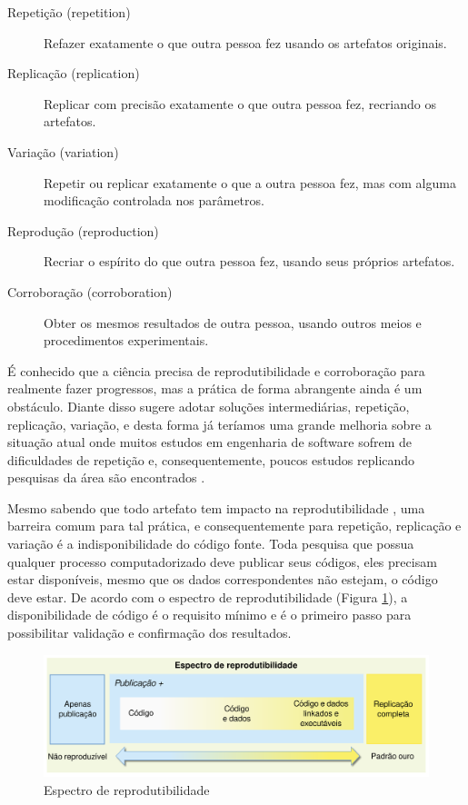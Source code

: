\begin{description}

  \item[Repetição (repetition)]
  Refazer exatamente o que outra pessoa fez usando os artefatos originais.

  \item[Replicação (replication)]
  Replicar com precisão exatamente o que outra pessoa fez, recriando os
  artefatos.

  \item[Variação (variation)]
  Repetir ou replicar exatamente o que a outra pessoa fez, mas com alguma
  modificação controlada nos parâmetros.

  \item[Reprodução (reproduction)]
  Recriar o espírito do que outra pessoa fez, usando seus próprios artefatos.

  \item[Corroboração (corroboration)]
  Obter os mesmos resultados de outra pessoa, usando outros meios e
  procedimentos experimentais.

\end{description}

É conhecido que a ciência precisa de reprodutibilidade e corroboração para
realmente fazer progressos, mas a prática de forma abrangente ainda é um
obstáculo. Diante disso  sugere adotar soluções
intermediárias, repetição, replicação, variação, e desta forma já teríamos uma
grande melhoria sobre a situação atual onde muitos estudos em engenharia de
software sofrem de dificuldades de repetição \cite{Tang2016} e,
consequentemente, poucos estudos replicando pesquisas da área são encontrados
\cite{da2011replication}.

Mesmo sabendo que todo artefato tem impacto na reprodutibilidade
\cite{gonzalez2012reproducibility}, uma barreira comum para tal prática, e
consequentemente para repetição, replicação e variação é a indisponibilidade do
código fonte. Toda pesquisa que possua qualquer processo computadorizado deve
publicar seus códigos, eles precisam estar disponíveis, mesmo que os dados
correspondentes não estejam, o código deve estar. De acordo com o espectro de
reprodutibilidade (Figura \ref{reproducibility-spectrum}), a disponibilidade de
código é o requisito mínimo e é o primeiro passo para possibilitar validação e
confirmação dos resultados.

\begin{figure}[h]
  \center
  \includegraphics[scale=0.35]{imagens/reproducibility-spectrum-ptbr.png}
  \caption{Espectro de reprodutibilidade \cite{Peng2011}}
  \label{reproducibility-spectrum}
\end{figure}

